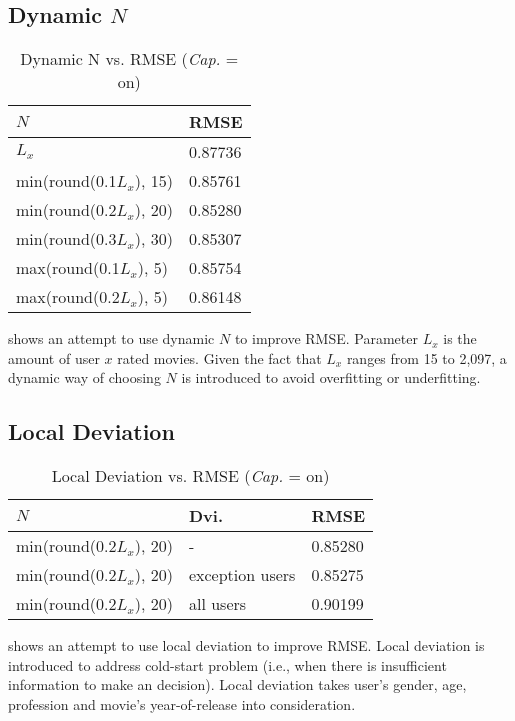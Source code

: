 \documentclass{ece}
\begin{document}
\subsection{Dynamic $N$}

\begin{table}[h]
    \caption[Dynamic N vs. RMSE]{Dynamic N vs. RMSE (\textit{Cap.} = on)}
    \label{tab:table-4}
    \centering
\begin{tabular}{|l|l|}
\hline
$N$            & RMSE    \\ \hline
$L_x$                    & 0.87736 \\ \hline
min(round(0.1$L_x$), 15) & 0.85761 \\ \hline
min(round(0.2$L_x$), 20) & 0.85280 \\ \hline
min(round(0.3$L_x$), 30) & 0.85307 \\ \hline
max(round(0.1$L_x$), 5)  & 0.85754 \\ \hline
max(round(0.2$L_x$), 5)  & 0.86148 \\ \hline
\end{tabular}
\end{table}

 shows an attempt to use dynamic $N$ to improve RMSE.
Parameter $L_x$ is the amount of user $x$ rated movies.
Given the fact that $L_x$ ranges from 15 to 2,097, a dynamic way of choosing $N$ is introduced to avoid overfitting or underfitting.

\subsection{Local Deviation}

\begin{table}[h]
    \caption[Local Deviation vs. RMSE]{Local Deviation vs. RMSE (\textit{Cap.} = on)}
    \label{tab:table-5}
    \centering
\begin{tabular}{|l|l|l|}
\hline
$N$                        & Dvi.            & RMSE    \\ \hline
min(round(0.2$L_x$), 20) & -               & 0.85280 \\ \hline
min(round(0.2$L_x$), 20) & exception users & 0.85275 \\ \hline
min(round(0.2$L_x$), 20) & all users       & 0.90199 \\ \hline
\end{tabular}
\end{table}

 shows an attempt to use local deviation to improve RMSE.
Local deviation is introduced to address cold-start problem (i.e., when there is insufficient information to make an decision).
Local deviation takes user's gender, age, profession and movie's year-of-release into consideration.
\end{document}

